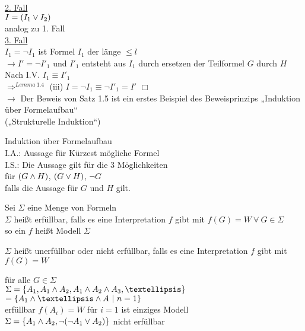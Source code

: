\noindent
\underline{2. Fall}\\
$I = (I_1 \vee I_2)$\\
analog zu 1. Fall\\

\noindent
\underline{3. Fall}\\
$I_1 = \neg I_1$ ist Formel $I_1$ der länge $\leq l$\\
$\rightarrow I' = \neg I'_1$ und $I'_1$ entsteht aus $I_1$ durch ersetzen der Teilformel $G$ durch $H$\\

\noindent
Nach I.V. \hspace{1cm} $I_1 \equiv I'_1$\\
$\Rightarrow^{Lemma\ 1.4}$ (iii) $I = \neg I_1 \equiv \neg I'_1 = I'$ $\Box$\\
$\rightarrow$ Der Beweis von Satz 1.5 ist ein erstes Beispiel des Beweisprinzips „Induktion über Formelaufbau“\\
(„Strukturelle Induktion“)


\beweis{}
Induktion über Formelaufbau\\
I.A.: Aussage für Kürzest mögliche Formel\\
I.S.: Die Aussage gilt für die 3 Möglichkeiten\\
für $(G \wedge H)$, $(G \vee H)$, $\neg G$\\
falls die Aussage für $G$ und $H$ gilt.

Sei $\Sigma$ eine Menge von Formeln\\
$\Sigma$ heißt erfüllbar, falls es eine Interpretation $f$ gibt mit $f(G) = W\ \forall\ G \in \Sigma$\\
so ein $f$ heißt Modell $\Sigma$

\noindent
$\Sigma$ heißt unerfüllbar oder nicht erfüllbar, falls es eine Interpretation $f$ gibt mit $f(G) = W$

\noindent
für alle $G \in \Sigma$\\

\beispiel{}
$\Sigma = \{A_1, A_1 \AND A_2, A_1 \AND A_2 \AND A_3, … \}$\\
$= \{A_1 \AND … \AND A \ |\ n=1 \}$\\

\noindent
erfüllbar $f(A_i) = W$ für $i=1$ ist einziges Modell\\
$\Sigma = \{A_1 \wedge A_2, \neg ( \neg A_1 \vee A_2) \}$ nicht erfüllbar\\

